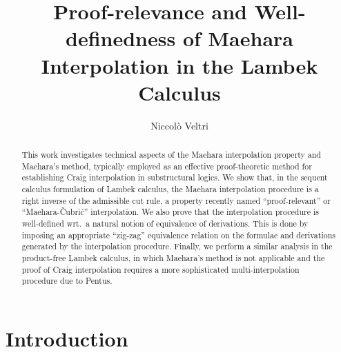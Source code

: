 \documentclass[a4paper,UKenglish,cleveref,autoref,thm-restate, anonymous]{lipics-v2021}
\title{Proof-relevance and Well-definedness of Maehara Interpolation in the Lambek Calculus}
\author{Niccol{\`o} Veltri}{Tallinn University of Technology, Tallinn, Estonia}{niccolo@cs.ioc.ee}{https://orcid.org/0000-0002-7230-3436}{}
\newcommand{\GG}{\Gamma}
\renewcommand{\L}{$\mathtt{L}$}
\newcommand{\vd}{\vdash}
\newcommand{\niccolo}[1]{\textcolor{red}{NV: #1}}
\begin{document}
\maketitle

\begin{abstract}
This work investigates technical aspects of the Maehara interpolation property and Maehara's method, typically employed as an effective proof-theoretic method for establishing Craig interpolation in substructural logics.
  We show that, in the sequent calculus formulation of Lambek calculus, the Maehara interpolation procedure is a right inverse of the admissible cut rule, a property recently named ``proof-relevant'' or ``Maehara-Čubrić'' interpolation.
  We also prove that the interpolation procedure is well-defined wrt.\ a natural notion of equivalence of derivations.
  This is done by imposing an appropriate ``zig-zag'' equivalence relation on %
  the formulae and derivations generated by the interpolation procedure.
  Finally, we perform a similar analysis in the product-free Lambek calculus, in which Maehara's method is not applicable and the proof of Craig interpolation requires a more sophisticated multi-interpolation procedure due to Pentus.
\end{abstract}

%
%
%

\section{Introduction}\label{sec:intro}
\end{document}
